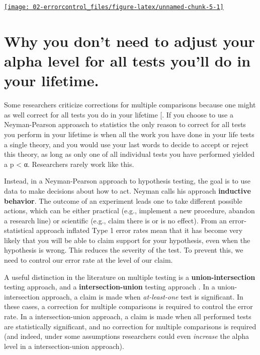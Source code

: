 \documentclass[
]{krantz}
\begin{document}
\begin{center}\href{https://shiny.ieis.tue.nl/JustifyAlpha/}{\texttt{[image: 02-errorcontrol\_files/figure-latex/unnamed-chunk-5-1]} }\end{center}

\hypertarget{multiplecomparisons}{%
\section{Why you don't need to adjust your alpha level for all tests you'll do in your lifetime.}\label{multiplecomparisons}}

Some researchers criticize corrections for multiple comparisons because one might as well correct for all tests you do in your lifetime {[}\citet{perneger_whats_1998}. If you choose to use a Neyman-Pearson approasch to statistics the only reason to correct for all tests you perform in your lifetime is when all the work you have done in your life tests a single theory, and you would use your last words to decide to accept or reject this theory, as long as only one of all individual tests you have performed yielded a p \textless{} α. Researchers rarely work like this.

Instead, in a Neyman-Pearson approach to hypothesis testing, the goal is to use data to make decisions about how to act. Neyman \citep{neyman_inductive_1957} calls his approach \textbf{inductive behavior}. The outcome of an experiment leads one to take different possible actions, which can be either practical (e.g., implement a new procedure, abandon a research line) or scientific (e.g., claim there is or is no effect). From an error-statistical approach \citep{mayo_statistical_2018} inflated Type 1 error rates mean that it has become very likely that you will be able to claim support for your hypothesis, even when the hypothesis is wrong. This reduces the severity of the test. To prevent this, we need to control our error rate at the level of our claim.

A useful distinction in the literature on multiple testing is a \textbf{union-intersection} testing approach, and a \textbf{intersection-union} testing approach \citep{dmitrienko_traditional_2013}. In a union-intersection approach, a claim is made when \emph{at-least-one} test is significant. In these cases, a correction for multiple comparisons is required to control the error rate. In a intersection-union approach, a claim is made when all performed tests are statistically significant, and no correction for multiple comparisons is required (and indeed, under some assumptions researchers could even \emph{increase} the alpha level in a intersection-union approach).
\end{document}
